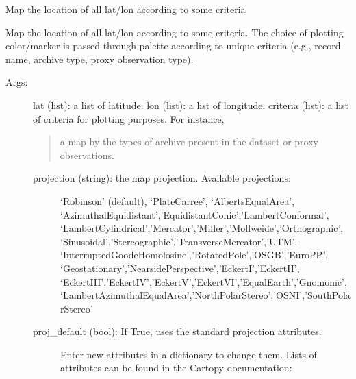 \documentclass[letterpaper,10pt,english]{sphinxmanual}
\begin{document}

\begin{fulllineitems}
\label{\detokenize{Map:pyleoclim.Map.mapAll}}
Map the location of all lat/lon according to some criteria

Map the location of all lat/lon according to some criteria. The choice of 
plotting color/marker is passed through palette according to unique 
criteria (e.g., record name, archive type, proxy observation type).
\begin{description}
\item[{Args:}] \leavevmode
lat (list): a list of latitude.
lon (list): a list of longitude.
criteria (list): a list of criteria for plotting purposes. For instance,
\begin{quote}

a map by the types of archive present in the dataset or proxy
observations.
\end{quote}
\begin{description}
\item[{projection (string): the map projection. Available projections:}] \leavevmode
‘Robinson’ (default), ‘PlateCarree’, ‘AlbertsEqualArea’,
‘AzimuthalEquidistant’,’EquidistantConic’,’LambertConformal’,
‘LambertCylindrical’,’Mercator’,’Miller’,’Mollweide’,’Orthographic’,
‘Sinusoidal’,’Stereographic’,’TransverseMercator’,’UTM’,
‘InterruptedGoodeHomolosine’,’RotatedPole’,’OSGB’,’EuroPP’,
‘Geostationary’,’NearsidePerspective’,’EckertI’,’EckertII’,
‘EckertIII’,’EckertIV’,’EckertV’,’EckertVI’,’EqualEarth’,’Gnomonic’,
‘LambertAzimuthalEqualArea’,’NorthPolarStereo’,’OSNI’,’SouthPolarStereo’

\item[{proj\_default (bool): If True, uses the standard projection attributes.}] \leavevmode
Enter new attributes in a dictionary to change them. Lists of attributes
can be found in the Cartopy documentation:
\begin{quote}

\end{quote}


\end{description}
\end{description}
\end{fulllineitems}
\end{document}
